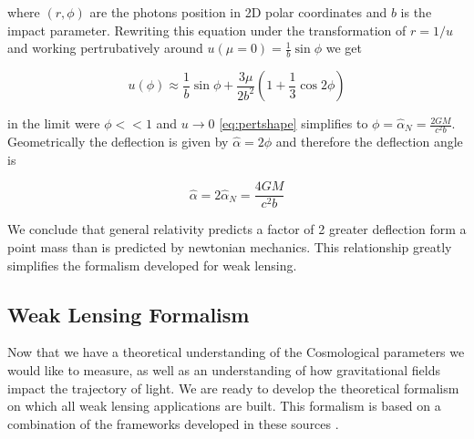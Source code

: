 where $(r,\phi)$ are the photons position in 2D polar coordinates and $b$ is the impact parameter. Rewriting this equation
under the transformation of $r = 1/u$ and working pertrubatively around $u(\mu =0) = \frac{1}{b}\sin \phi
$ we get 

\begin{equation}
  u(\phi) \approx \frac{1}{b}\sin \phi + \frac{3\mu}{2b^2} \left(1+\frac{1}{3}\cos 2 \phi \right)
  \label{eq:pertshape}
\end{equation}

in the limit were $\phi << 1$ and $u \rightarrow 0$ \autoref{eq:pertshape} simplifies to $\phi = \hat{\alpha}_N =\frac{2GM}{c^2b} $. Geometrically the deflection is given by $\hat{\alpha}= 2\phi$ and therefore the deflection angle is

\begin{equation}
  \hat{\alpha} = 2\hat{\alpha}_N=\frac{4GM}{c^2b}
  \label{grbend}
\end{equation}

We conclude that general relativity predicts a factor of 2 greater deflection form a point mass than is predicted by newtonian mechanics. This relationship greatly simplifies the formalism developed for weak lensing. 

\subsection{Weak Lensing Formalism}
Now that we have a theoretical understanding of the Cosmological parameters we would like to measure, as well as an understanding of how gravitational fields impact the trajectory of light. We are ready to develop the theoretical formalism on which all weak lensing applications are built. This formalism is based on a combination of the frameworks developed in these sources \cite{basicLens,general_2013,rachel_2018,hoekstra,massey_2013,Mellier:1998pk,Hoekstra:2013gua}.

